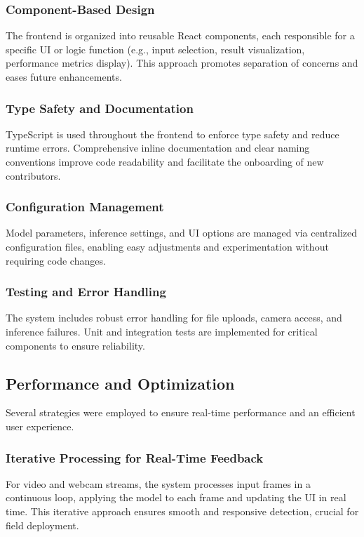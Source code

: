 \subsubsection{Component-Based Design}
The frontend is organized into reusable React components, each responsible for a specific UI or logic function (e.g., input selection, result visualization, performance metrics display). This approach promotes separation of concerns and eases future enhancements.

\subsubsection{Type Safety and Documentation}
TypeScript is used throughout the frontend to enforce type safety and reduce runtime errors. Comprehensive inline documentation and clear naming conventions improve code readability and facilitate the onboarding of new contributors.

\subsubsection{Configuration Management}
Model parameters, inference settings, and UI options are managed via centralized configuration files, enabling easy adjustments and experimentation without requiring code changes.

\subsubsection{Testing and Error Handling}
The system includes robust error handling for file uploads, camera access, and inference failures. Unit and integration tests are implemented for critical components to ensure reliability.

\subsection{Performance and Optimization}
Several strategies were employed to ensure real-time performance and an efficient user experience.

\subsubsection{Iterative Processing for Real-Time Feedback}
For video and webcam streams, the system processes input frames in a continuous loop, applying the model to each frame and updating the UI in real time. This iterative approach ensures smooth and responsive detection, crucial for field deployment.


